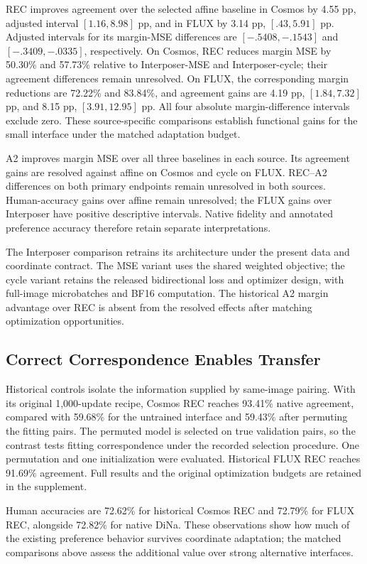 \documentclass[10pt,twocolumn,letterpaper]{article}
\begin{document}
REC improves agreement over the selected affine baseline in Cosmos by 4.55 pp, adjusted interval $[1.16,8.98]$ pp, and in FLUX by 3.14 pp, $[.43,5.91]$ pp. Adjusted intervals for its margin-MSE differences are $[-.5408,-.1543]$ and $[-.3409,-.0335]$, respectively. On Cosmos, REC reduces margin MSE by 50.30\% and 57.73\% relative to Interposer-MSE and Interposer-cycle; their agreement differences remain unresolved. On FLUX, the corresponding margin reductions are 72.22\% and 83.84\%, and agreement gains are 4.19 pp, $[1.84,7.32]$ pp, and 8.15 pp, $[3.91,12.95]$ pp. All four absolute margin-difference intervals exclude zero. These source-specific comparisons establish functional gains for the small interface under the matched adaptation budget.

A2 improves margin MSE over all three baselines in each source. Its agreement gains are resolved against affine on Cosmos and cycle on FLUX. REC--A2 differences on both primary endpoints remain unresolved in both sources. Human-accuracy gains over affine remain unresolved; the FLUX gains over Interposer have positive descriptive intervals. Native fidelity and annotated preference accuracy therefore retain separate interpretations.

The Interposer comparison retrains its architecture under the present data and coordinate contract. The MSE variant uses the shared weighted objective; the cycle variant retains the released bidirectional loss and optimizer design, with full-image microbatches and BF16 computation. The historical A2 margin advantage over REC is absent from the resolved effects after matching optimization opportunities.

\subsection{Correct Correspondence Enables Transfer}
\label{sec:clean}
Historical controls isolate the information supplied by same-image pairing. With its original 1,000-update recipe, Cosmos REC reaches 93.41\% native agreement, compared with 59.68\% for the untrained interface and 59.43\% after permuting the fitting pairs. The permuted model is selected on true validation pairs, so the contrast tests fitting correspondence under the recorded selection procedure. One permutation and one initialization were evaluated. Historical FLUX REC reaches 91.69\% agreement. Full results and the original optimization budgets are retained in the supplement.

Human accuracies are 72.62\% for historical Cosmos REC and 72.79\% for FLUX REC, alongside 72.82\% for native DiNa. These observations show how much of the existing preference behavior survives coordinate adaptation; the matched comparisons above assess the additional value over strong alternative interfaces.
\end{document}
